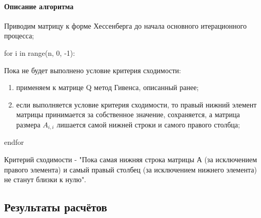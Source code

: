 \documentclass[a4paper]{article}
\begin{document}
\paragraph{Описание алгоритма}

Приводим матрицу к форме Хессенберга до начала основного итерационного процесса;

for i in range(n, 0, -1):

Пока не будет выполнено условие критерия сходимости:

\begin{enumerate}
\item применяем к матрице Q метод Гивенса, описанный ранее;	
\item если выполняется условие критерия сходимости, то правый нижний элемент матрицы принимается за собственное значение, сохраняется, а матрица размера $A_{i, i}$ лишается самой нижней строки и самого правого столбца;
\end{enumerate}
endfor

Критерий сходимости - "Пока самая нижняя строка матрицы А (за исключением правого элемента) и самый правый столбец (за исключением нижнего элемента) не станут близки к нулю".



\newpage

\subsection{Результаты расчётов}
\end{document}
